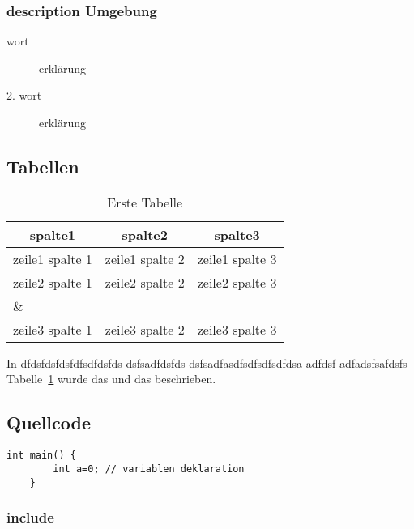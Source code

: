 \documentclass{scrbook}
\begin{document}
\subsubsection{description Umgebung}

\begin{description}
\item[wort] erklärung
\item[2. wort] erklärung
\end{description}
\newpage
\subsection{Tabellen}

\begin{table}[htb]
\centering
\begin{tabular}{l|l|l}
\toprule
 \multicolumn{1}{c|}{\textbf{spalte1}} & \multicolumn{1}{c|}{\textbf{spalte2}} &
 \multicolumn{1}{c}{\textbf{spalte3}} \\ \midrule zeile1 spalte 1 & zeile1
 spalte 2 & zeile1 spalte 3 \\
zeile2 spalte 1 & zeile2 spalte 2 & zeile2 spalte 3 \\ 
\& & & \\
zeile3 spalte 1 & zeile3 spalte 2 & zeile3 spalte 3 \\
\bottomrule
\end{tabular}
\caption{Erste Tabelle}
\label{tab:erstetabelle}
\end{table}
In dfdsfdsfdsfdfsdfdsfds dsfsadfdsfds dsfsadfasdfsdfsdfsdfdsa adfdsf
adfadsfsafdsfs  Tabelle~\ref{tab:erstetabelle} wurde das und das beschrieben.

\subsection{Quellcode}
\begin{lstlisting}[caption=mein erster Quellcode, label={lst:quellcode1}]
    int main() {
        int a=0; // variablen deklaration
    }
\end{lstlisting}

\subsubsection{include}
 
 
\end{document}
